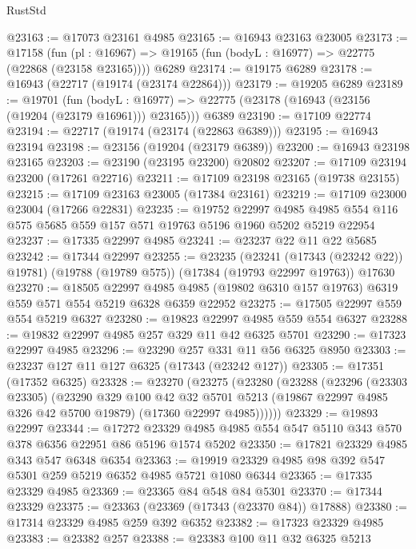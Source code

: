 \begin{lexlean}{RustStd}
\begin{coremodule}
@23163 := @17073 @23161 @4985
@23165 := @16943 @23163 @23005
@23173 := @17158
    (fun (pl : @16967) => @19165 (fun (bodyL : @16977) => @22775 (@22868 (@23158 @23165))))
    @6289
@23174 := @19175 @6289
@23178 := @16943 (@22717 (@19174 (@23174 @22864)))
@23179 := @19205 @6289
@23189 := @19701
    (fun (bodyL : @16977) => @22775 (@23178 (@16943 (@23156 (@19204 (@23179 @16961))) @23165)))
    @6389
@23190 := @17109 @22774
@23194 := @22717 (@19174 (@23174 (@22863 @6389)))
@23195 := @16943 @23194
@23198 := @23156 (@19204 (@23179 @6389))
@23200 := @16943 @23198 @23165
@23203 := @23190 (@23195 @23200) @20802
@23207 := @17109 @23194 @23200 (@17261 @22716)
@23211 := @17109 @23198 @23165 (@19738 @23155)
@23215 := @17109 @23163 @23005 (@17384 @23161)
@23219 := @17109 @23000 @23004 (@17266 @22831)
@23235 := @19752
    @22997
    @4985
    @4985
    @554
    @116
    @575
    @5685
    @559
    @157
    @571
    @19763
    @5196
    @1960
    @5202
    @5219
    @22954
@23237 := @17335 @22997 @4985
@23241 := @23237 @22 @11 @22 @5685
@23242 := @17344 @22997
@23255 := @23235
    (@23241 (@17343 (@23242 @22)) @19781)
    (@19788 (@19789 @575))
    (@17384 (@19793 @22997 @19763))
    @17630
@23270 := @18505
    @22997
    @4985
    @4985
    (@19802 @6310 @157 @19763)
    @6319
    @559
    @571
    @554
    @5219
    @6328
    @6359
    @22952
@23275 := @17505 @22997 @559 @554 @5219 @6327
@23280 := @19823 @22997 @4985 @559 @554 @6327
@23288 := @19832 @22997 @4985 @257 @329 @11 @42 @6325 @5701
@23290 := @17323 @22997 @4985
@23296 := @23290 @257 @331 @11 @56 @6325 @8950
@23303 := @23237 @127 @11 @127 @6325 (@17343 (@23242 @127))
@23305 := @17351 (@17352 @6325)
@23328 := @23270
    (@23275
      (@23280
        (@23288
          (@23296
            (@23303 @23305)
            (@23290
              @329
              @100
              @42
              @32
              @5701
              @5213
              (@19867 @22997 @4985 @326 @42 @5700 @19879)
              (@17360 @22997 @4985))))))
@23329 := @19893 @22997
@23344 := @17272
    @23329
    @4985
    @4985
    @554
    @547
    @5110
    @343
    @570
    @378
    @6356
    @22951
    @86
    @5196
    @1574
    @5202
@23350 := @17821 @23329 @4985 @343 @547 @6348 @6354
@23363 := @19919 @23329 @4985 @98 @392 @547 @5301 @259 @5219 @6352 @4985 @5721 @1080 @6344
@23365 := @17335 @23329 @4985
@23369 := @23365 @84 @548 @84 @5301
@23370 := @17344 @23329
@23375 := @23363 (@23369 (@17343 (@23370 @84)) @17888)
@23380 := @17314 @23329 @4985 @259 @392 @6352
@23382 := @17323 @23329 @4985
@23383 := @23382 @257
@23388 := @23383 @100 @11 @32 @6325 @5213

\end{coremodule}
\end{lexlean}
